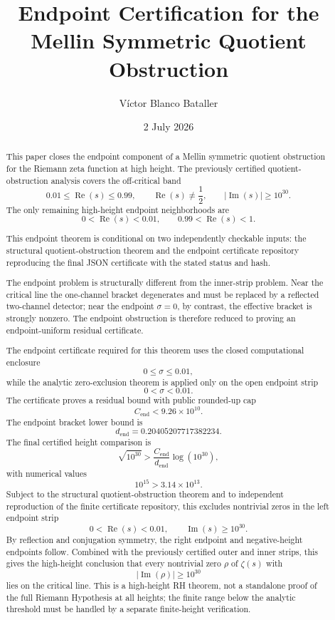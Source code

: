 \documentclass[11pt]{article}
\title{Endpoint Certification for the Mellin Symmetric Quotient Obstruction}
\author{V\'ictor Blanco Bataller}
\date{2 July 2026}
\DeclareMathOperator{\Rea}{Re}
\DeclareMathOperator{\Ima}{Im}
\newcommand{\Cend}{C_{\mathrm{end}}}
\newcommand{\dend}{d_{\mathrm{end}}}
\begin{document}
\maketitle

\begin{abstract}
This paper closes the endpoint component of a Mellin symmetric quotient obstruction for the Riemann zeta function at high height.  The previously certified quotient-obstruction analysis covers the off-critical band
\[
0.01\leq \Rea(s)\leq 0.99,
\qquad
\Rea(s)\neq \frac12,
\qquad
|\Ima(s)|\geq 10^{30}.
\]
The only remaining high-height endpoint neighborhoods are
\[
0<\Rea(s)<0.01,
\qquad
0.99<\Rea(s)<1.
\]

This endpoint theorem is conditional on two independently checkable inputs:
the structural quotient-obstruction theorem and the endpoint certificate
repository reproducing the final JSON certificate with the stated status and
hash.

The endpoint problem is structurally different from the inner-strip problem.  Near the critical line the one-channel bracket degenerates and must be replaced by a reflected two-channel detector; near the endpoint \(\sigma=0\), by contrast, the effective bracket is strongly nonzero.  The endpoint obstruction is therefore reduced to proving an endpoint-uniform residual certificate.

The endpoint certificate required for this theorem uses the closed computational
enclosure
\[
0\leq \sigma\leq 0.01,
\]
while the analytic zero-exclusion theorem is applied only on the open endpoint
strip
\[
0<\sigma<0.01.
\]
The certificate proves a residual bound with public rounded-up cap
\[
\Cend < 9.26\times10^{10}.
\]
The endpoint bracket lower bound is
\[
\dend=0.20405207717382234.
\]
The final certified height comparison is
\[
\sqrt{10^{30}}
>
\frac{\Cend}{\dend}\log(10^{30}),
\]
with numerical values
\[
10^{15}
>
3.14\times10^{13}.
\]
Subject to the structural quotient-obstruction theorem and to independent reproduction of the finite certificate repository, this excludes nontrivial zeros in the left endpoint strip
\[
0<\Rea(s)<0.01,
\qquad
\Ima(s)\geq 10^{30}.
\]
By reflection and conjugation symmetry, the right endpoint and negative-height endpoints follow.  Combined with the previously certified outer and inner strips, this gives the high-height conclusion that every nontrivial zero \(\rho\) of \(\zeta(s)\) with
\[
|\Ima(\rho)|\geq 10^{30}
\]
lies on the critical line.  This is a high-height RH theorem, not a standalone proof of the full Riemann Hypothesis at all heights; the finite range below the analytic threshold must be handled by a separate finite-height verification.
\end{abstract}
\end{document}
